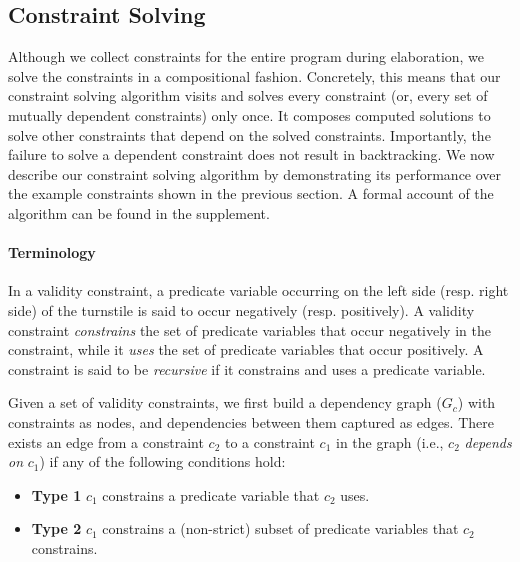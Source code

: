 \subsection{Constraint Solving}
\label{sec:csolve}

Although we collect constraints for the entire program during
elaboration, we solve the constraints in a compositional fashion.
Concretely, this means that our constraint solving algorithm visits
and solves every constraint (or, every set of mutually dependent
constraints) only once. It composes computed solutions to solve other
constraints that depend on the solved constraints. Importantly, the
failure to solve a dependent constraint does not result in
backtracking. We now describe our constraint solving algorithm by
demonstrating its performance over the example constraints shown in
the previous section. A formal account of the algorithm can be found
in the supplement.

\paragraph{Terminology} In a validity constraint, a predicate variable
occurring on the left side (resp. right side) of the turnstile is said
to occur negatively (resp. positively). A validity constraint
\emph{constrains} the set of predicate variables that occur negatively
in the constraint, while it \emph{uses} the set of predicate variables
that occur positively. A constraint is said to be \emph{recursive} if
it constrains and uses a predicate variable.

Given a set of validity constraints, we first build a dependency graph
($G_c$) with constraints as nodes, and dependencies between them
captured as edges. There exists an edge from a constraint $c_2$ to a
constraint $c_1$ in the graph (i.e., $c_2$ \emph{depends on} $c_1$) if
any of the following conditions hold:
\begin{itemize}
\item \textbf{Type 1} $c_1$ constrains a predicate variable that $c_2$ uses. 
\item \textbf{Type 2} $c_1$ constrains a (non-strict) subset of predicate variables
that $c_2$ constrains.
\end{itemize}

